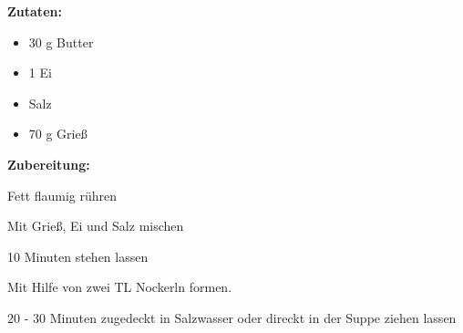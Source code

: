 

\textbf {Zutaten:} \\
\begin{itemize}
	\item 30 g Butter
	\item 1 Ei
	\item Salz
	\item 70 g Grieß
\end{itemize}

\vspace* {2cm}

\textbf {Zubereitung:} \\
\begin{compactenum}
	\item Fett flaumig rühren
	\item Mit Grieß, Ei und Salz mischen
	\item 10 Minuten stehen lassen
	\item Mit Hilfe von zwei TL Nockerln formen.
	\item 20 - 30 Minuten zugedeckt in Salzwasser oder direckt in der Suppe ziehen lassen
\end{compactenum}



